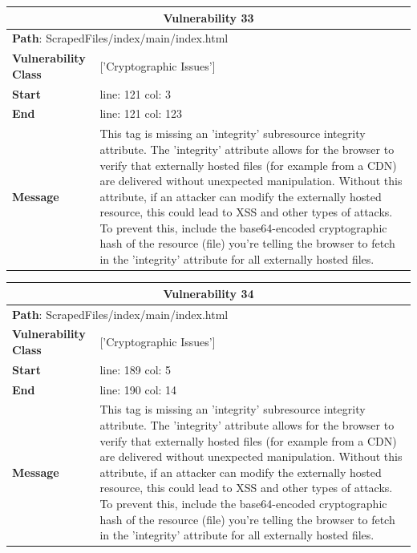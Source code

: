 \documentclass[12pt]{article}
\begin{document}
\vspace{0.7cm}
\FloatBarrier
\begin{table}[!h]
\centering
\renewcommand{\arraystretch}{1.3}
\begin{tabular}{|l|p{10cm}|}
\hline
\multicolumn{2}{|c|}{\textbf{Vulnerability 33}} \\
\hline
\multicolumn{2}{|l|}{\textbf{Path}: ScrapedFiles/index/main/index.html} \\
\hline
\textbf{Vulnerability Class} & ['Cryptographic Issues'] \\
\hline
\textbf{Start} & line: 121 \quad col: 3 \\
\hline
\textbf{End} & line: 121 \quad col: 123 \\
\hline
\textbf{Message} & This tag is missing an 'integrity' subresource integrity attribute. The 'integrity' attribute allows for the browser to verify that externally hosted files (for example from a CDN) are delivered without unexpected manipulation. Without this attribute, if an attacker can modify the externally hosted resource, this could lead to XSS and other types of attacks. To prevent this, include the base64-encoded cryptographic hash of the resource (file) you're telling the browser to fetch in the 'integrity' attribute for all externally hosted files. \\
\hline
\end{tabular}
\end{table}
\vspace{0.7cm}
\FloatBarrier
\begin{table}[!h]
\centering
\renewcommand{\arraystretch}{1.3}
\begin{tabular}{|l|p{10cm}|}
\hline
\multicolumn{2}{|c|}{\textbf{Vulnerability 34}} \\
\hline
\multicolumn{2}{|l|}{\textbf{Path}: ScrapedFiles/index/main/index.html} \\
\hline
\textbf{Vulnerability Class} & ['Cryptographic Issues'] \\
\hline
\textbf{Start} & line: 189 \quad col: 5 \\
\hline
\textbf{End} & line: 190 \quad col: 14 \\
\hline
\textbf{Message} & This tag is missing an 'integrity' subresource integrity attribute. The 'integrity' attribute allows for the browser to verify that externally hosted files (for example from a CDN) are delivered without unexpected manipulation. Without this attribute, if an attacker can modify the externally hosted resource, this could lead to XSS and other types of attacks. To prevent this, include the base64-encoded cryptographic hash of the resource (file) you're telling the browser to fetch in the 'integrity' attribute for all externally hosted files. \\
\hline
\end{tabular}
\end{table}
\end{document}
